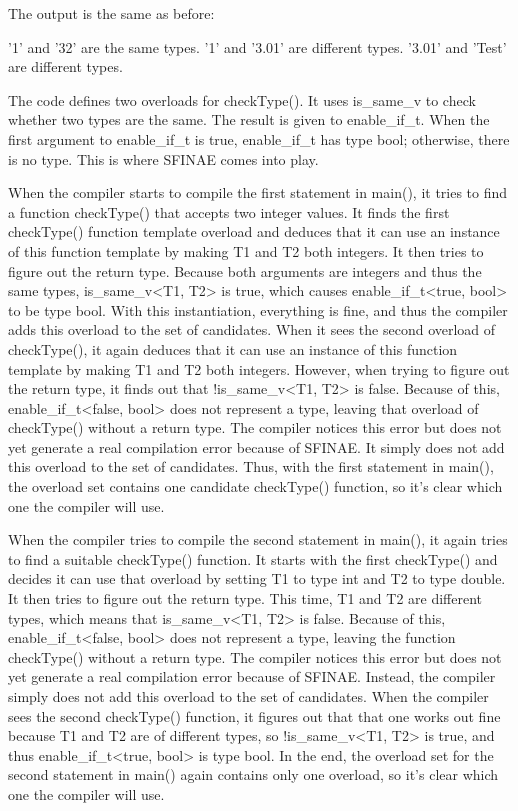 The output is the same as before:

\begin{shell}
'1' and '32' are the same types.
'1' and '3.01' are different types.
'3.01' and 'Test' are different types.
\end{shell}

The code defines two overloads for checkType(). It uses is\_same\_v to check whether two types are the same. The result is given to enable\_if\_t. When the first argument to enable\_if\_t is true, enable\_if\_t has type bool; otherwise, there is no type. This is where SFINAE comes into play.

When the compiler starts to compile the first statement in main(), it tries to find a function checkType() that accepts two integer values. It finds the first checkType() function template overload and deduces that it can use an instance of this function template by making T1 and T2 both integers. It then tries to figure out the return type. Because both arguments are integers and thus the same types, is\_same\_v<T1, T2> is true, which causes enable\_if\_t<true, bool> to be type bool. With this instantiation, everything is fine, and thus the compiler adds this overload to the set of candidates. When it sees the second overload of checkType(), it again deduces that it can use an instance of this function template by making T1 and T2 both integers. However, when trying to figure out the return type, it finds out that !is\_same\_v<T1, T2> is false. Because of this, enable\_if\_t<false, bool> does not represent a type, leaving that overload of checkType() without a return type. The compiler notices this error but does not yet generate a real compilation error because of SFINAE. It simply does not add this overload to the set of candidates. Thus, with the first statement in main(), the overload set contains one candidate checkType() function, so it’s clear which one the compiler will use.

When the compiler tries to compile the second statement in main(), it again tries to find a suitable checkType() function. It starts with the first checkType() and decides it can use that overload by setting T1 to type int and T2 to type double. It then tries to figure out the return type. This time, T1 and T2 are different types, which means that is\_same\_v<T1, T2> is false. Because of this, enable\_if\_t<false, bool> does not represent a type, leaving the function checkType() without a return type. The compiler notices this error but does not yet generate a real compilation error because of SFINAE. Instead, the compiler simply does not add this overload to the set of candidates. When the compiler sees the second checkType() function, it figures out that that one works out fine because T1 and T2 are of different types, so !is\_same\_v<T1, T2> is true, and thus enable\_if\_t<true, bool> is type bool. In the end, the overload set for the second statement in main() again contains only one overload, so it’s clear which one the compiler will use.

